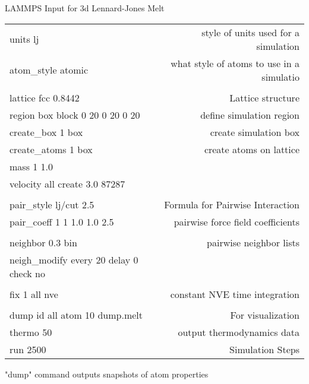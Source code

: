 \documentclass[slidestop,mathserif,compress,xcolor=svgnames]{beamer}
\newenvironment{eblock}[0]
{
\begin{beamerboxesrounded}[upper=uppercol2,lower=lowercol2,shadow=true]}
{\end{beamerboxesrounded}}
\begin{document}
\begin{frame}
  \frametitle{}
  \begin{eblock}{LAMMPS Input for 3d Lennard-Jones Melt}
    {\tiny
    \begin{tabular}{lr}
    units   lj & {\color{red}style of units used for a simulation}\\
    atom\_style  atomic & {\color{red}what style of atoms to use in a simulatio}\\
     & \\
    lattice   fcc 0.8442 & {\color{red}Lattice structure}\\
    region    box block 0 20 0 20 0 20 & {\color{red}define simulation region}\\
    create\_box  1 box & {\color{red}create simulation box}\\
    create\_atoms  1 box & {\color{red}create atoms on lattice}\\
    mass    1 1.0 & {\color{red}}\\
    velocity  all create 3.0 87287 & {\color{red}}\\
     & \\
    pair\_style  lj/cut 2.5 & {\color{red}Formula for Pairwise Interaction}\\
    pair\_coeff  1 1 1.0 1.0 2.5 & {\color{red}pairwise force field coefficients}\\
     & \\
    neighbor  0.3 bin & {\color{red}pairwise neighbor lists}\\
    neigh\_modify  every 20 delay 0 check no & {\color{red}}\\
     & \\
    fix   1 all nve & {\color{red}constant NVE time integration}\\
     & \\
    dump    id all atom 10 dump.melt & {\color{red}For visualization}\\
    thermo    50 & {\color{red}output thermodynamics data}\\
    run   2500 & {\color{red}Simulation Steps}\\
    \end{tabular}
    }
  \end{eblock}
  \begin{itemize}
    {\tiny
    \item "dump" command outputs snapshots of atom properties
    \begin{columns}
      \column{11cm}
      \vspace{-0.5cm}

\end{columns}}
\end{itemize}
\end{frame}
\end{document}
